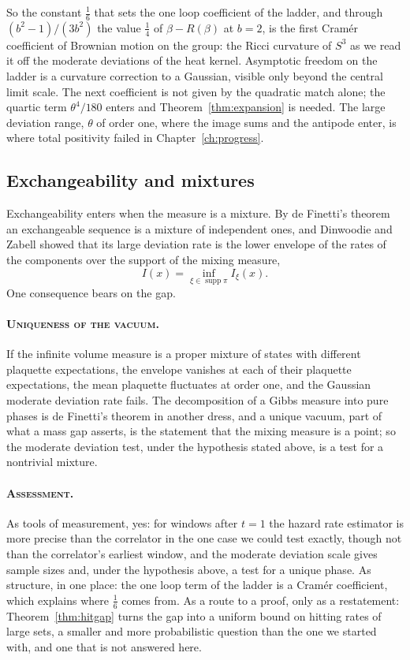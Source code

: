 So the constant $\frac16$ that sets the one loop coefficient of the ladder, and through $(b^2-1)/(3b^2)$ the value $\frac14$ of $\beta-R(\beta)$ at $b=2$, is the first Cram\'er coefficient of Brownian motion on the group: the Ricci curvature of $S^3$ as we read it off the moderate deviations of the heat kernel. Asymptotic freedom on the ladder is a curvature correction to a Gaussian, visible only beyond the central limit scale. The next coefficient is not given by the quadratic match alone; the quartic term $\theta^4/180$ enters and Theorem~\ref{thm:expansion} is needed. The large deviation range, $\theta$ of order one, where the image sums and the antipode enter, is where total positivity failed in Chapter~\ref{ch:progress}.

\subsection*{Exchangeability and mixtures}
Exchangeability enters when the measure is a mixture. By de Finetti's theorem an exchangeable sequence is a mixture of independent ones, and Dinwoodie and Zabell \cite{DiZa92} showed that its large deviation rate is the lower envelope of the rates of the components over the support of the mixing measure,
\[
I(x)=\inf_{\xi\in\operatorname{supp}\pi}I_\xi(x).
\]
One consequence bears on the gap.

\paragraph{\normalfont\scshape Uniqueness of the vacuum.} If the infinite volume measure is a proper mixture of states with different plaquette expectations, the envelope vanishes at each of their plaquette expectations, the mean plaquette fluctuates at order one, and the Gaussian moderate deviation rate fails. The decomposition of a Gibbs measure into pure phases is de Finetti's theorem in another dress, and a unique vacuum, part of what a mass gap asserts, is the statement that the mixing measure is a point; so the moderate deviation test, under the hypothesis stated above, is a test for a nontrivial mixture.

\paragraph{\normalfont\scshape Assessment.} As tools of measurement, yes: for windows after $t=1$ the hazard rate estimator is more precise than the correlator in the one case we could test exactly, though not than the correlator's earliest window, and the moderate deviation scale gives sample sizes and, under the hypothesis above, a test for a unique phase. As structure, in one place: the one loop term of the ladder is a Cram\'er coefficient, which explains where $\frac16$ comes from. As a route to a proof, only as a restatement: Theorem~\ref{thm:hitgap} turns the gap into a uniform bound on hitting rates of large sets, a smaller and more probabilistic question than the one we started with, and one that is not answered here.

